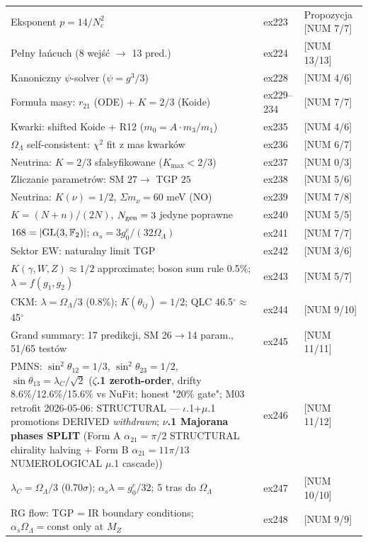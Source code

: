 \begin{center}
\begin{tabular}{@{}lll@{}}
Eksponent $p = 14/N_c^2$ & ex223 & Propozycja [NUM 7/7] \\
Pe\l{}ny \l{}a\'ncuch (8 wej\'s\'c $\to$ 13 pred.) & ex224 & [NUM 13/13] \\
Kanoniczny $\psi$-solver ($\psi = g^3/3$) & ex228 & [NUM 4/6] \\
Formu\l{}a masy: $r_{21}$ (ODE) + $K=2/3$ (Koide) & ex229--234 & [NUM 7/7] \\
Kwarki: shifted Koide + R12 ($m_0 = A \cdot m_3/m_1$) & ex235 & [NUM 4/6] \\
$\Omega_\Lambda$ self-consistent: $\chi^2$ fit z mas kwark\'ow & ex236 & [NUM 6/7] \\
Neutrina: $K=2/3$ sfalsyfikowane ($K_{\max} < 2/3$) & ex237 & [NUM 0/3] \\
Zliczanie parametr\'ow: SM $27 \to$ TGP $25$ & ex238 & [NUM 5/6] \\
Neutrina: $K(\nu)=1/2$, $\Sigma m_\nu = 60$ meV (NO) & ex239 & [NUM 7/8] \\
$K = (N+n)/(2N)$, $N_{\rm gen}=3$ jedyne poprawne & ex240 & [NUM 5/5] \\
$168 = |{\rm GL}(3,\mathbb{F}_2)|$; $\alpha_s = 3g_0^e/(32\Omega_\Lambda)$ & ex241 & [NUM 7/7] \\
Sektor EW: naturalny limit TGP & ex242 & [NUM 3/6] \\
$K(\gamma,W,Z)\approx 1/2$ approximate; boson sum rule 0.5\%; $\lambda=f(g_1,g_2)$ & ex243 & [NUM 5/7] \\
CKM: $\lambda=\Omega_\Lambda/3$ (0.8\%); $K(\theta_{ij})=1/2$; QLC 46.5$^\circ\approx$45$^\circ$ & ex244 & [NUM 9/10] \\
Grand summary: 17 predikcji, SM 26$\to$14 param., 51/65 test\'ow & ex245 & [NUM 11/11] \\
PMNS: $\sin^2\theta_{12}=1/3$, $\sin^2\theta_{23}=1/2$, $\sin\theta_{13}=\lambda_C/\sqrt{2}$ (\textbf{$\zeta$.1 zeroth-order}, drifty 8.6\%/12.6\%/15.6\% vs NuFit; honest "20\% gate"; M03 retrofit 2026-05-06: STRUCTURAL — $\iota$.1+$\mu$.1 promotions DERIVED \emph{withdrawn}; \textbf{$\nu$.1 Majorana phases SPLIT} (Form A $\alpha_{21}{=}\pi/2$ STRUCTURAL chirality halving + Form B $\alpha_{21}{=}11\pi/13$ NUMEROLOGICAL $\mu$.1 cascade)) & ex246 & [NUM 11/12] \\
$\lambda_C=\Omega_\Lambda/3$ (0.70$\sigma$); $\alpha_s\lambda=g_0^e/32$; 5 tras do $\Omega_\Lambda$ & ex247 & [NUM 10/10] \\
RG flow: TGP = IR boundary conditions; $\alpha_s\Omega_\Lambda=\text{const}$ only at $M_Z$ & ex248 & [NUM 9/9] \\

\end{tabular}
\end{center}
